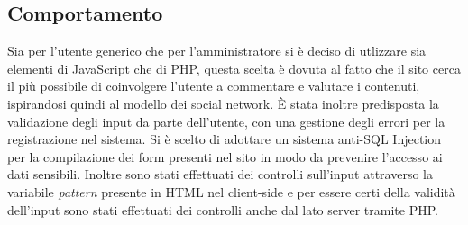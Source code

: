 \subsection{Comportamento}
Sia per l'utente generico che per l'amministratore si è deciso di utlizzare sia elementi di JavaScript che di PHP, questa scelta è dovuta al fatto che il sito cerca il più possibile di coinvolgere l'utente a commentare e valutare i contenuti, ispirandosi quindi al modello dei social network. È stata inoltre predisposta la validazione degli input da parte dell’utente, con una gestione degli errori per la registrazione nel sistema. Si è scelto di adottare un sistema anti-SQL Injection per la compilazione dei form presenti nel sito in modo da prevenire l'accesso ai dati sensibili. Inoltre sono stati effettuati dei controlli sull'input attraverso la variabile \textit{pattern} presente in HTML nel client-side e per essere certi della validità dell'input sono stati effettuati dei controlli anche dal lato server tramite PHP.


